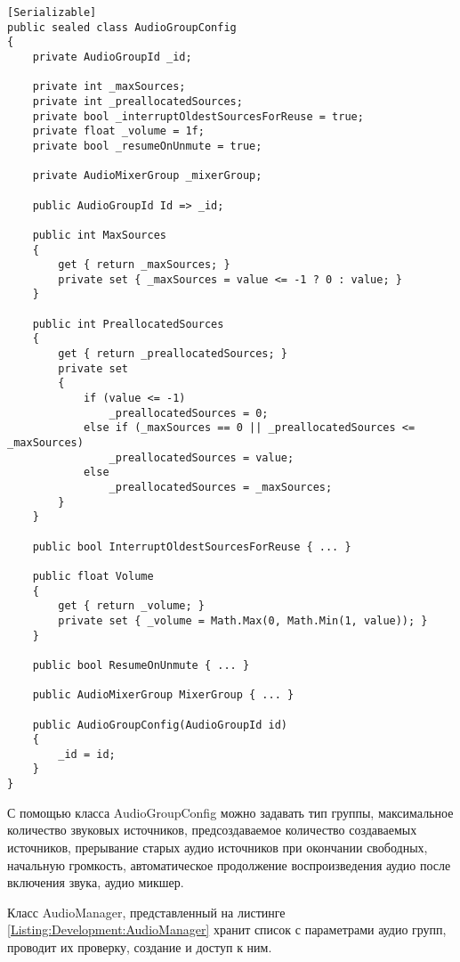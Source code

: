 \begin{lstlisting}[caption={Класс с настройками аудио группы}, label=Listing:Development:AudioConfig]
[Serializable]
public sealed class AudioGroupConfig
{
    private AudioGroupId _id;

    private int _maxSources;
    private int _preallocatedSources;
    private bool _interruptOldestSourcesForReuse = true;
    private float _volume = 1f;
    private bool _resumeOnUnmute = true;

    private AudioMixerGroup _mixerGroup;

    public AudioGroupId Id => _id;

    public int MaxSources
    {
        get { return _maxSources; }
        private set { _maxSources = value <= -1 ? 0 : value; }
    }

    public int PreallocatedSources
    {
        get { return _preallocatedSources; }
        private set
        {
            if (value <= -1)
                _preallocatedSources = 0;
            else if (_maxSources == 0 || _preallocatedSources <= _maxSources)
                _preallocatedSources = value;
            else
                _preallocatedSources = _maxSources;
        }
    }

    public bool InterruptOldestSourcesForReuse { ... }

    public float Volume
    {
        get { return _volume; }
        private set { _volume = Math.Max(0, Math.Min(1, value)); }
    }

    public bool ResumeOnUnmute { ... }

    public AudioMixerGroup MixerGroup { ... }

    public AudioGroupConfig(AudioGroupId id)
    {
        _id = id;
    }
}
\end{lstlisting}

С помощью класса AudioGroupConfig можно задавать тип группы, максимальное количество звуковых источников, предсоздаваемое количество создаваемых источников, прерывание старых аудио источников при окончании свободных, начальную громкость, автоматическое продолжение воспроизведения аудио после включения звука, аудио микшер.

Класс AudioManager, представленный на листинге \ref{Listing:Development:AudioManager} хранит список с параметрами аудио групп, проводит их проверку, создание и доступ к ним.

